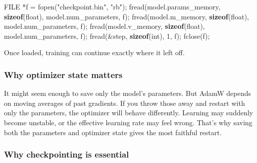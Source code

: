 \documentclass[
  letterpaper,
  DIV=11,
  numbers=noendperiod]{scrreprt}
\newenvironment{Shaded}{\begin{snugshade}}{\end{snugshade}}
\newcommand{\DataTypeTok}[1]{\textcolor[rgb]{0.68,0.00,0.00}{#1}}
\newcommand{\DecValTok}[1]{\textcolor[rgb]{0.68,0.00,0.00}{#1}}
\newcommand{\KeywordTok}[1]{\textcolor[rgb]{0.00,0.23,0.31}{\textbf{#1}}}
\newcommand{\NormalTok}[1]{\textcolor[rgb]{0.00,0.23,0.31}{#1}}
\newcommand{\OperatorTok}[1]{\textcolor[rgb]{0.37,0.37,0.37}{#1}}
\newcommand{\StringTok}[1]{\textcolor[rgb]{0.13,0.47,0.30}{#1}}
\begin{document}
\begin{Shaded}
\begin{Highlighting}[]
\DataTypeTok{FILE} \OperatorTok{*}\NormalTok{f }\OperatorTok{=}\NormalTok{ fopen}\OperatorTok{(}\StringTok{"checkpoint.bin"}\OperatorTok{,} \StringTok{"rb"}\OperatorTok{);}
\NormalTok{fread}\OperatorTok{(}\NormalTok{model}\OperatorTok{.}\NormalTok{params\_memory}\OperatorTok{,} \KeywordTok{sizeof}\OperatorTok{(}\DataTypeTok{float}\OperatorTok{),}\NormalTok{ model}\OperatorTok{.}\NormalTok{num\_parameters}\OperatorTok{,}\NormalTok{ f}\OperatorTok{);}
\NormalTok{fread}\OperatorTok{(}\NormalTok{model}\OperatorTok{.}\NormalTok{m\_memory}\OperatorTok{,} \KeywordTok{sizeof}\OperatorTok{(}\DataTypeTok{float}\OperatorTok{),}\NormalTok{ model}\OperatorTok{.}\NormalTok{num\_parameters}\OperatorTok{,}\NormalTok{ f}\OperatorTok{);}
\NormalTok{fread}\OperatorTok{(}\NormalTok{model}\OperatorTok{.}\NormalTok{v\_memory}\OperatorTok{,} \KeywordTok{sizeof}\OperatorTok{(}\DataTypeTok{float}\OperatorTok{),}\NormalTok{ model}\OperatorTok{.}\NormalTok{num\_parameters}\OperatorTok{,}\NormalTok{ f}\OperatorTok{);}
\NormalTok{fread}\OperatorTok{(\&}\NormalTok{step}\OperatorTok{,} \KeywordTok{sizeof}\OperatorTok{(}\DataTypeTok{int}\OperatorTok{),} \DecValTok{1}\OperatorTok{,}\NormalTok{ f}\OperatorTok{);}
\NormalTok{fclose}\OperatorTok{(}\NormalTok{f}\OperatorTok{);}
\end{Highlighting}
\end{Shaded}

Once loaded, training can continue exactly where it left off.

\subsubsection{Why optimizer state
matters}\label{why-optimizer-state-matters}

It might seem enough to save only the model's parameters. But AdamW
depends on moving averages of past gradients. If you throw those away
and restart with only the parameters, the optimizer will behave
differently. Learning may suddenly become unstable, or the effective
learning rate may feel wrong. That's why saving both the parameters and
optimizer state gives the most faithful restart.

\subsubsection{Why checkpointing is
essential}\label{why-checkpointing-is-essential}
\end{document}
